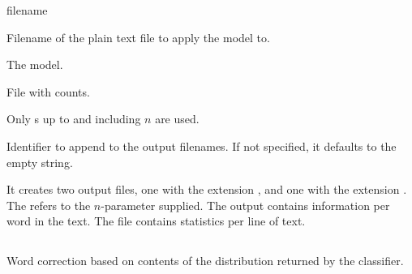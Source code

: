 \documentclass[a4paper,10pt,twoside]{report}
\begin{document}
\begin{varlist}{filename}
\item[filename] Filename of the plain text file to apply the model to.
\item[ngl] The \ngram{} model.
\item[counts] File with counts.
\item[n] Only \ngram{}s up to and including $n$ are used.
\item[id] Identifier to append to the output filenames. If not
  specified, it defaults to the empty string.
\end{varlist}

It creates two output files, one with the extension , and
one with the extension . The  refers to the
$n$-parameter supplied. The  output contains information per
word in the text. The  file contains statistics per line of
text. 

\subsection{}

Word correction based on contents of the distribution returned by the
classifier.
\end{document}
